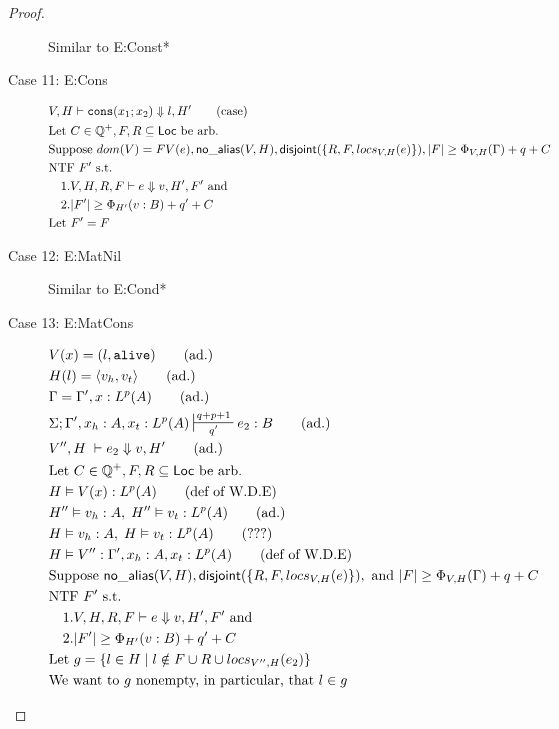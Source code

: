 \documentclass[sigconf]{acmart}
\newcommand{\ms}[1]{\ensuremath{\mathsf{#1}}}
\newcommand{\irl}[1]{\mathtt{#1}}
\newcommand{\na}[1]{\mathsf{no\_alias}(#1)}
\newcommand{\dist}[1]{\mathsf{disjoint}(#1)}
\theoremstyle{definition}
\begin{document}
\begin{proof}
\begin{description}
  Similar to E:Const*
  \item[Case 11: E:Cons]
  \begin{align*}
  &V,H \vdash \consexabt{x_1}{x_2} \Downarrow l, H' \tag{case}\\
  &\text{Let } C \in \mathbb{Q}^+, F,R \subseteq \ms{Loc} \text{ be arb.}\\
  &\text{Suppose } dom(V) = FV(e), \na{V,H}, \dist{\{R,F,locs_{V,H}(e)\}}, |F| \ge \Phi_{V,H}(\Gamma) + q + C\\
  &\text{NTF } F' \text{ s.t. }\\
  &\quad 1. V,H,R,F \vdash e \Downarrow v, H',F' \text{ and }\\ 
  &\quad 2. |F'| \ge \Phi_{H'}(v:B) + q' + C\\
  &\text{Let } F' = F \ 
  \end{align*}
  \item[Case 12: E:MatNil]
  Similar to E:Cond*
  \item[Case 13: E:MatCons]
  \begin{align*}
  &V(x) = (l,\irl{alive}) \tag{ad.}\\
  &H(l) = \pairexcst{v_h}{v_t} \tag{ad.}\\
  &\Gamma = \Gamma', x : L^p(A) \tag{ad.}\\
  &\Sigma; \Gamma', x_h : A, x_t : L^p(A) \sststile{q'}{q + p + 1} e_2 : B \tag{ad.}\\
  &V'',H \; \vdash e_2 \Downarrow v, H' \tag{ad.}\\
  &\text{Let } C \in \mathbb{Q}^+, F,R \subseteq \ms{Loc} \text{ be arb.}\\
  &H \vDash V(x) : L^p(A) \tag{def of W.D.E}\\
  &H''\vDash v_h : A,\; H'' \vDash v_t : L^p(A) \tag{ad.}\\
  &H\vDash v_h : A,\; H \vDash v_t : L^p(A) \tag{???}\\
  &H \vDash V'' : \Gamma', x_h : A, x_t : L^p(A) \tag{def of W.D.E}\\
  &\text{Suppose }  \na{V,H}, \dist{\{R,F,locs_{V,H}(e)\}}, \text{ and } |F| \ge \Phi_{V,H}(\Gamma) + q + C\\
  &\text{NTF } F' \text{ s.t. }\\
  &\quad 1. V,H,R,F \vdash e \Downarrow v, H',F' \text{ and }\\ 
  &\quad 2. |F'| \ge \Phi_{H'}(v:B) + q' + C\\
  &\text{Let } g = \{l \in H \mid l \notin F \cup R \cup locs_{V'',H}(e_2)\}\\
  &\text{We want to $g$ nonempty, in particular, that } l \in g\\

\end{align*}
\end{description}
\end{proof}
\end{document}
